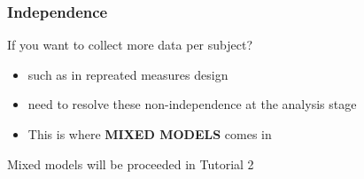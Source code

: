 \documentclass{beamer}\usepackage[]{graphicx}\usepackage[]{color}
\begin{document}
\begin{frame}
\frametitle{Independence}
If you want to collect more data per subject?
\begin{itemize}
\item such as in repreated measures design
\item need to resolve these non-independence at the analysis stage
\item This is where \textbf{MIXED MODELS} comes in
\end{itemize}
\pause
\begin{center}
\huge
Mixed models will be proceeded in Tutorial 2
\end{center}
\end{frame}
\end{document}
